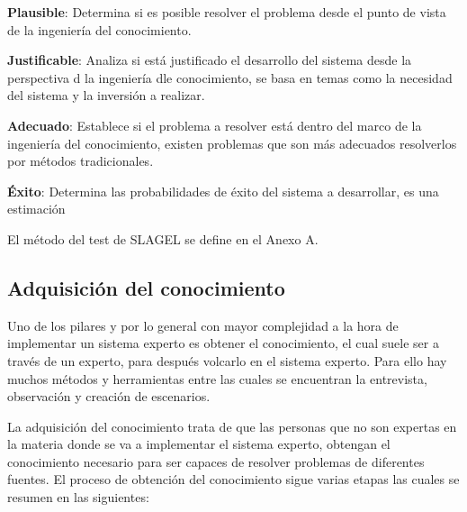 \begin{compactitem}
  \item \textbf{Plausible}: Determina si es posible resolver el problema desde el
     punto de vista de la ingeniería del conocimiento.
  \item \textbf{Justificable}: Analiza si está justificado el desarrollo del
     sistema desde la perspectiva d la ingeniería dle conocimiento, se basa en
     temas como la necesidad del sistema y la inversión a realizar.
  \item \textbf{Adecuado}: Establece si el problema a resolver está dentro
     del marco de la ingeniería del conocimiento, existen problemas que son más
     adecuados resolverlos por métodos tradicionales.
  \item \textbf{Éxito}: Determina las probabilidades de éxito del sistema a
     desarrollar, es una estimación
\end{compactitem}

El método del test de SLAGEL se define en el Anexo A.


\subsection{Adquisición del conocimiento}


Uno de los pilares y por lo general con mayor complejidad a la hora de implementar
 un sistema experto es obtener el conocimiento, el cual suele ser a través de un experto,
 para después volcarlo en el sistema experto. Para ello hay muchos métodos y herramientas
 entre las cuales se encuentran la entrevista, observación y creación de escenarios.


La adquisición del conocimiento trata de que las personas que no son expertas en la materia
 donde se va a implementar el sistema experto, obtengan el conocimiento necesario para ser
 capaces de resolver problemas de diferentes fuentes. El proceso de obtención del conocimiento
 sigue varias etapas las cuales se resumen en las siguientes:

